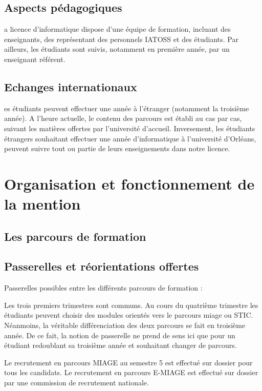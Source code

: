 \documentclass[10pt, a5paper]{report}
\begin{document}
\begin{spacing}{1.5}




\section*{Aspects pédagogiques}
a licence d'informatique dispose d'une équipe de formation, incluant des enseignants, des représentant des personnels IATOSS et des étudiants. Par ailleurs, les étudiants sont suivis, notamment en première année, par un enseignant référent.

\section*{Echanges internationaux}
es étudiants peuvent effectuer une année à l'étranger (notamment la troisième année). A l'heure actuelle, le contenu des parcours est établi au cas par cas, suivant les matières offertes par l'université d'accueil. Inversement, les étudiants étrangers souhaitant effectuer une année d'informatique à l'université d'Orléans, peuvent suivre tout ou partie de leurs enseignements dans notre licence. 


\chapter*{Organisation et fonctionnement de la mention}
\section*{Les parcours de formation}
\section*{Passerelles et réorientations offertes}
Passerelles possibles entre les différents parcours de formation :

Les trois premiers trimestres sont communs. Au cours du quatrième trimestre les étudiants peuvent choisir des modules orientés vers le parcours miage ou STIC. Néanmoins, la véritable différenciation des deux parcours se fait en troisième année. De ce fait, la notion de passerelle ne prend de sens ici que pour un étudiant redoublant sa troisième année et souhaitant changer de parcours.

Le recrutement en parcours MIAGE au semestre 5 est effectué sur dossier pour tous les candidats. 
Le recrutement en parcours E-MIAGE est effectué sur dossier par une commission de recrutement nationale. 


\end{spacing}
\end{document}
